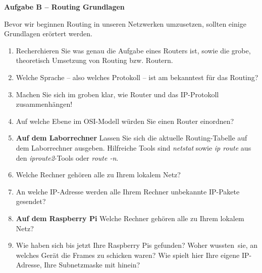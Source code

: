 \documentclass[paper=a4,fontsize=11pt]{scrartcl}%
\numberwithin{equation}{section}
\begin{document}
{\begin{center}\Large{\textbf{Aufgabe B -- Routing Grundlagen}}\end{center}\vskip0.25in
Bevor wir beginnen Routing in unseren Netzwerken umzusetzen, sollten einige Grundlagen erörtert werden. 
\begin{enumerate}
	\item Recherchieren Sie was genau die Aufgabe eines Routers ist, sowie die grobe, theoretisch Umsetzung von Routing bzw. Routern. 
	\item Welche Sprache -- also welches Protokoll -- ist am bekanntest für das Routing? 
	\item Machen Sie sich im groben klar, wie Router und das IP-Protokoll zusammenhängen!
	\item Auf welche Ebene im OSI-Modell würden Sie einen Router einordnen?
	\item \textbf{Auf dem Laborrechner} Lassen Sie sich die aktuelle Routing-Tabelle auf dem Laborrechner ausgeben. Hilfreiche Tools sind \emph{netstat} sowie \emph{ip route} aus den \emph{iproute2}-Tools oder \emph{route -n}.
	\item Welche Rechner gehören alle zu Ihrem lokalem Netz?
	\item An welche IP-Adresse werden alle Ihrem Rechner unbekannte IP-Pakete gesendet?
	\item \textbf{Auf dem Raspberry Pi} Welche Rechner gehören alle zu Ihrem lokalem Netz?
	\item Wie haben sich bis jetzt Ihre Raspberry Pis gefunden? Woher \glqq wussten\grqq\ sie, an welches Gerät die Frames zu schicken waren? Wie spielt hier Ihre eigene IP-Adresse, Ihre Subnetzmaske mit hinein?
\end{enumerate}

}
\end{document}
